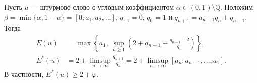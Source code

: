\begin{theorem}\label{thmconsn1}
Пусть $u$ --- штурмово слово с угловым коэффициентом
$\alpha\in(0,1)\setminus\mathbb Q$.
Положим $\beta=\min\{\alpha,1-\alpha\}=[0;a_1,a_2,\ldots]$,
$q_{-1}=0$, $q_0=1$ и
$q_{n+1}=a_{n+1}q_n+q_{n-1}$.
Тогда
\begin{align}
 E(u)&=\max\left\{a_1,\
       \sup_{n\ge1}\left(2+a_{n+1}+\frac{q_{n-1}-2}{q_n}\right)\right\},
       \label{eq:correct-index}\\
 E^*(u)&=2+\limsup_{n\to\infty}\frac{q_{n+1}}{q_n}
       =2+\limsup_{n\to\infty}[a_n;a_{n-1},\ldots,a_1].
       \label{eq:correct-asymptotic-index}
\end{align}
В частности, $E^*(u)\ge2+\varphi$.
\end{theorem}

